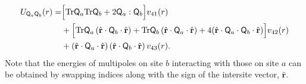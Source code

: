 \begin{align}
%
%
\begin{split}
U_{\mathsf{Q}_a \mathsf{Q}_b}(r)=&
\Bigl[
\text{Tr} \mathsf{Q}_a \text{Tr} \mathsf{Q}_b
+2
\mathsf{Q}_a : \mathsf{Q}_b \Bigr] v_{41}(r)
\\
&+\Bigl[ \text{Tr}\mathsf{Q}_a
 \left( \hat{\mathbf{r}} \cdot 
\mathsf{Q}_b \cdot \hat{\mathbf{r}} \right)
+\text{Tr}\mathsf{Q}_b
\left( \hat{\mathbf{r}} \cdot \mathsf{Q}_a
 \cdot \hat{\mathbf{r}} \right)  +4 (\hat{\mathbf{r}}  \cdot
\mathsf{Q}_a \cdot \mathsf{Q}_b \cdot \hat{\mathbf{r}})
\Bigr] v_{42}(r)
 \\
&+ 
\left( \hat{\mathbf{r}} \cdot  \mathsf{Q}_a \cdot \hat{\mathbf{r}} \right)
\left( \hat{\mathbf{r}} \cdot \mathsf{Q}_b  \cdot \hat{\mathbf{r}} \right) v_{43}(r).
\label{uquadquad}
\end{split}
\end{align}
%
Note that the energies of multipoles on site $b$ interacting
with those on site $a$ can be obtained by swapping indices
along with the sign of the intersite vector, $\hat{\mathbf{r}}$.

%
%
%

